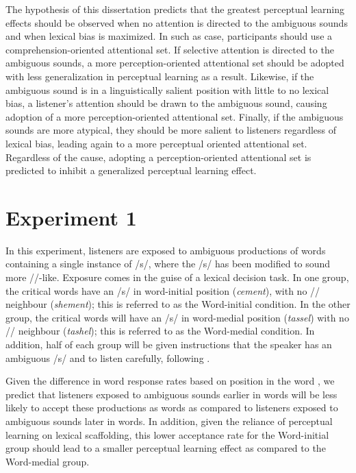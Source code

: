 The hypothesis of this dissertation predicts that the greatest perceptual learning effects should be observed when no attention is directed to the ambiguous sounds and when lexical bias is maximized.  
In such as case, participants should use a comprehension-oriented attentional set.  
If selective attention is directed to the ambiguous sounds, a more perception-oriented attentional set should be adopted with less generalization in perceptual learning as a result. 
Likewise, if the ambiguous sound is in a linguistically salient position with little to no lexical bias, a listener's attention should be drawn to the ambiguous sound, causing adoption of a more perception-oriented attentional set.  
Finally, if the ambiguous sounds are more atypical, they should be more salient to listeners regardless of lexical bias, leading again to a more perceptual oriented attentional set.  
Regardless of the cause, adopting a perception-oriented attentional set is predicted to inhibit a generalized perceptual learning effect.

\section{Experiment 1}

In this experiment, listeners are exposed to ambiguous productions of words containing a single instance of /s/, where the /s/ has been modified to sound more /\textesh/-like.
Exposure comes in the guise of a lexical decision task. 
In one group, the critical words have an /s/ in word-initial position (\emph{cement}), with no /\textesh/ neighbour (\emph{shement}); this is referred to as the Word-initial condition.  
In the other group, the critical words will have an /s/ in word-medial position (\emph{tassel}) with no /\textesh/ neighbour (\emph{tashel}); this is referred to as the Word-medial condition.  
In addition, half of each group will be given instructions that the speaker has an ambiguous /s/ and to listen carefully, following \citet{Pitt2012}.

Given the difference in word response rates based on position in the word \citep{Pitt2012}, we predict that listeners exposed to ambiguous sounds earlier in words will be less likely to accept these productions as words as compared to listeners exposed to ambiguous sounds later in words.  
In addition, given the reliance of perceptual learning on lexical scaffolding, this lower acceptance rate for the Word-initial group should lead to a smaller perceptual learning effect as compared to the Word-medial group.

